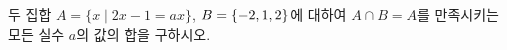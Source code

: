 두 집합 $A=\{x \mid 2x-1=ax\}$, $B=\{-2{,}\mkern3mu\mathopen{}1{,}\mkern3mu\mathopen{}2\}$에 대하여 $A\cap B=A$를 만족시키는 모든 실수 $a$의 값의 합을 구하시오.
